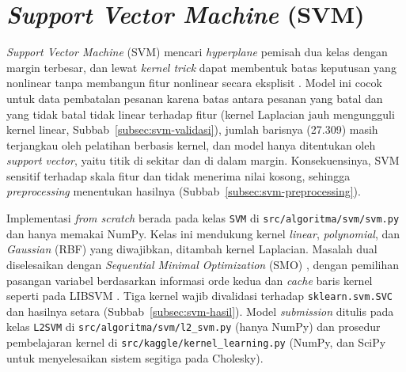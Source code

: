 \section{\textit{Support Vector Machine} (SVM)}
\label{sec:svm}


\textit{Support Vector Machine} (SVM) mencari \textit{hyperplane} pemisah dua kelas dengan margin terbesar, dan lewat \textit{kernel trick} dapat membentuk batas keputusan yang nonlinear tanpa membangun fitur nonlinear secara eksplisit \cite{ruskanda-svm-what,ruskanda-svm-linear,ruskanda-svm-nonlinear}. Model ini cocok untuk data pembatalan pesanan karena batas antara pesanan yang batal dan yang tidak batal tidak linear terhadap fitur (kernel Laplacian jauh mengungguli kernel linear, Subbab~\ref{subsec:svm-validasi}), jumlah barisnya (27.309) masih terjangkau oleh pelatihan berbasis kernel, dan model hanya ditentukan oleh \textit{support vector}, yaitu titik di sekitar dan di dalam margin. Konsekuensinya, SVM sensitif terhadap skala fitur dan tidak menerima nilai kosong, sehingga \textit{preprocessing} menentukan hasilnya (Subbab~\ref{subsec:svm-preprocessing}).

Implementasi \textit{from scratch} berada pada kelas \texttt{SVM} di \nolinkurl{src/algoritma/svm/svm.py} dan hanya memakai NumPy. Kelas ini mendukung kernel \textit{linear}, \textit{polynomial}, dan \textit{Gaussian} (RBF) yang diwajibkan, ditambah kernel Laplacian. Masalah dual diselesaikan dengan \textit{Sequential Minimal Optimization} (SMO) \cite{platt1998smo}, dengan pemilihan pasangan variabel berdasarkan informasi orde kedua \cite{fan2005wss} dan \textit{cache} baris kernel seperti pada LIBSVM \cite{chang2011libsvm}. Tiga kernel wajib divalidasi terhadap \texttt{sklearn.svm.SVC} \cite{pedregosa2011sklearn} dan hasilnya setara (Subbab~\ref{subsec:svm-hasil}). Model \textit{submission} ditulis pada kelas \texttt{L2SVM} di \nolinkurl{src/algoritma/svm/l2_svm.py} (hanya NumPy) dan prosedur pembelajaran kernel di \nolinkurl{src/kaggle/kernel_learning.py} (NumPy, dan SciPy untuk menyelesaikan sistem segitiga pada Cholesky).

